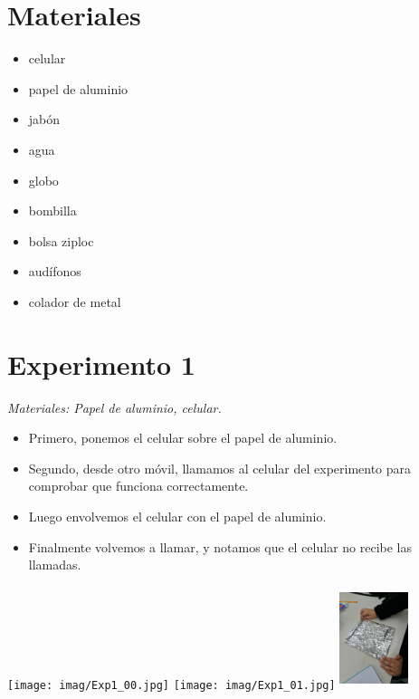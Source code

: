 \documentclass[a4paper, 12p]{article}
\newenvironment{Figura}
  {\par\medskip\noindent\minipage{\linewidth}}
  {\endminipage\par\medskip}
\begin{document}
\begin{multicols*}{2}



\section*{Materiales}

\begin{multicols*}{2}
\begin{itemize}
    \item celular
    \item papel de aluminio
    \item jabón
    \item agua
    \item globo
    \item bombilla
    \item bolsa ziploc
    \item audífonos
    \item colador de metal 
\end{itemize}
\end{multicols*}




\section*{Experimento 1}
\textit{Materiales: Papel de aluminio, celular.}

\vspace{-\topsep}
\begin{itemize}
    \setlength{\parskip}{0pt} 
    \setlength{\itemsep}{0pt plus 1pt}
    \item Primero, ponemos el celular sobre el papel de aluminio.
    \item Segundo, desde otro móvil, llamamos al celular del experimento para comprobar que funciona correctamente.
    \item Luego envolvemos el celular con el papel de aluminio.
    \item Finalmente volvemos a llamar, y notamos que el celular no recibe las llamadas.
\end{itemize}
\vspace{-\topsep}


\begin{Figura}
    \centering
    \texttt{[image: imag/Exp1\_00.jpg]}
    \texttt{[image: imag/Exp1\_01.jpg]}
    \includegraphics[width=2cm, height=3cm]{imag/Exp1_02.jpg}
\end{Figura}


\end{multicols*}
\end{document}
